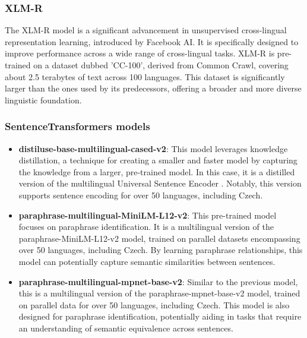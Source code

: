 \subsubsection{XLM-R} \label{model:xlm-roberta}
The \ac{XLM-R} model \cite{xlm-roberta} is a significant advancement in unsupervised cross-lingual representation learning, introduced by Facebook AI.
It is specifically designed to improve performance across a wide range of cross-lingual tasks.
\ac{XLM-R} is pre-trained on a dataset dubbed 'CC-100', derived from Common Crawl, covering about 2.5 terabytes of text across 100 languages.
This dataset is significantly larger than the ones used by its predecessors, offering a broader and more diverse linguistic foundation.

\subsubsection{SentenceTransformers models \cite{reimers-2019-sentence-bert}} \label{model:st-multilingual}

\begin{itemize}
  \item \textbf{distiluse-base-multilingual-cased-v2}: This model leverages knowledge distillation, a technique for creating a smaller and faster model by capturing the knowledge from a larger, pre-trained model. In this case, it is a distilled version of the multilingual Universal Sentence Encoder \cite{yang2019multilingual}. Notably, this version supports sentence encoding for over 50 languages, including Czech.
  \item \textbf{paraphrase-multilingual-MiniLM-L12-v2}: This pre-trained model focuses on paraphrase identification. It is a multilingual version of the paraphrase-MiniLM-L12-v2 model, trained on parallel datasets encompassing over 50 languages, including Czech. By learning paraphrase relationships, this model can potentially capture semantic similarities between sentences.
  \item \textbf{paraphrase-multilingual-mpnet-base-v2}: Similar to the previous model, this is a multilingual version of the paraphrase-mpnet-base-v2 model, trained on parallel data for over 50 languages, including Czech.  This model is also designed for paraphrase identification, potentially aiding in tasks that require an understanding of semantic equivalence across sentences.
\end{itemize}



